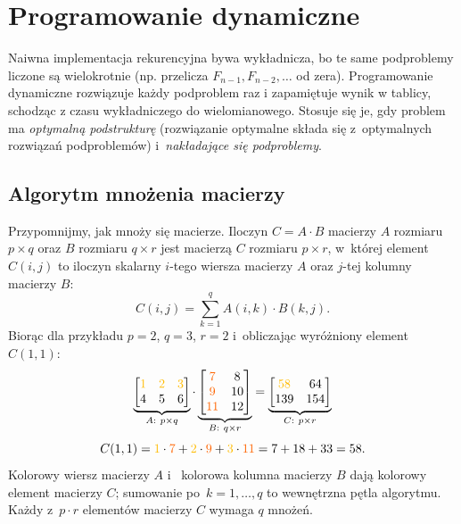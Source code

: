 \section{Programowanie dynamiczne}

Naiwna implementacja rekurencyjna bywa wykładnicza, bo te same podproblemy liczone są wielokrotnie
(np.  przelicza $F_{n-1}, F_{n-2}, \dots$ od zera). Programowanie dynamiczne rozwiązuje
każdy podproblem raz i zapamiętuje wynik w tablicy, schodząc z czasu wykładniczego do wielomianowego.
Stosuje się je, gdy problem ma \emph{optymalną podstrukturę} (rozwiązanie optymalne składa się
z~optymalnych rozwiązań podproblemów) i~\emph{nakładające się podproblemy}.

\subsection{Algorytm mnożenia macierzy}

Przypomnijmy, jak mnoży się macierze. Iloczyn $C = A \cdot B$ macierzy $A$ rozmiaru $p \times q$
oraz $B$ rozmiaru $q \times r$ jest macierzą $C$ rozmiaru $p \times r$, w~której element $C(i, j)$
to iloczyn skalarny $i$-tego wiersza macierzy $A$ oraz $j$-tej kolumny macierzy $B$:
\[
	C(i, j) = \sum_{k = 1}^{q} A(i, k) \cdot B(k, j).
\]
Biorąc dla przykładu $p = 2$, $q = 3$, $r = 2$ i~obliczając wyróżniony element $C(1, 1)$:
\[
	\underbrace{\begin{bmatrix}
			{\color{accentA}1} & {\color{accentA}2} & {\color{accentA}3} \\
			4                  & 5                  & 6
		\end{bmatrix}}_{A:\ p \times q}
	\cdot
	\underbrace{\begin{bmatrix}
			{\color{accentB}7}  & 8  \\
			{\color{accentB}9}  & 10 \\
			{\color{accentB}11} & 12
		\end{bmatrix}}_{B:\ q \times r}
	=
	\underbrace{\begin{bmatrix}
			{\color{accentA}58} & 64  \\
			139                 & 154
		\end{bmatrix}}_{C:\ p \times r}
\]
\[
	C(1, 1) = {\color{accentA}1} \cdot {\color{accentB}7} + {\color{accentA}2} \cdot {\color{accentB}9}
	+ {\color{accentA}3} \cdot {\color{accentB}11} = 7 + 18 + 33 = 58.
\]
Kolorowy wiersz macierzy $A$ i~ kolorowa kolumna macierzy $B$ dają kolorowy element macierzy $C$;
sumowanie po~$k = 1, \dots, q$ to wewnętrzna pętla algorytmu. Każdy z~$p \cdot r$ elementów macierzy
$C$ wymaga $q$ mnożeń.

